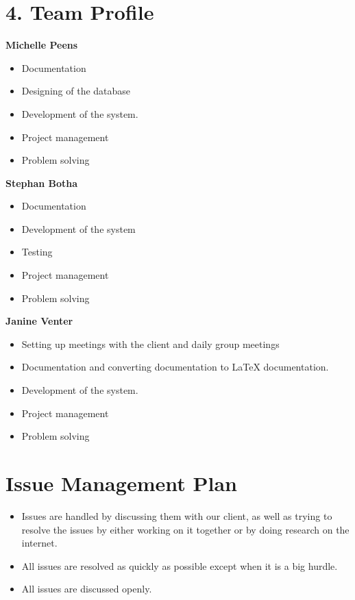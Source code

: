 \documentclass[29pt,a4paper]{moderncv}
\begin{document}
	\vspace{5mm}

\newpage
	\section*{4. Team Profile}
	\noindent\textbf{Michelle Peens}
		\begin{itemize}
			\item Documentation
			\item Designing of the database
			\item Development of the system.
			\item Project management
			\item Problem solving\\
		\end{itemize}
	
	\noindent\textbf{Stephan Botha}
		\begin{itemize}
			\item Documentation
			\item Development of the system
			\item Testing
			\item Project management
			\item Problem solving\\
		\end{itemize}
	
	\noindent\textbf{Janine Venter}
		\begin{itemize}
			\item Setting up meetings with the client and daily group meetings
			\item Documentation and converting documentation to LaTeX documentation.
			\item Development of the system.
			\item Project management
			\item Problem solving
		\end{itemize}
\newpage
		\section*{Issue Management Plan}
		\begin{itemize}
			\item Issues are handled by discussing them with our client, as well as trying to resolve the issues by either working on it together or by doing research on the internet.
			\item All issues are resolved as quickly as possible except when it is a big hurdle. 
			\item All issues are discussed openly.
		\end{itemize}
		
\end{document}
